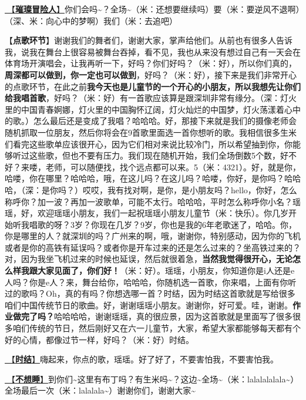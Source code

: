 \documentclass[]{ctexbook}
\begin{document}
\hyperref[adventurers]{🎵【\textbf{璀璨冒险人}】}你们会吗\textasciitilde？全场\textasciitilde（米：还想要继续吗）要（米：要逆风不退啊）（深、米：向心中的梦啊）我们（米：去追吧）

【\textbf{点歌环节}】谢谢我们的舞者们，谢谢大家，掌声给他们。从前也有很多人告诉我，说我在舞台上很容易被舞台吞掉，看不见，我也从来没有想过自己有一天会在体育场开演唱会，让我再听一下，好吗？你们好吗？（米：好），所以你们真的，\textbf{周深都可以做到，你一定也可以做到}，好吗？（米：好），接下来是我们非常开心的点歌环节，在此之前\textbf{我今天也是儿童节的一个开心的小朋友，所以我想先让你们给我唱首歌}，好吗？（米：好）有一首歌应该算是跟深圳非常有缘分。（深：灯火里的中国青春婀娜，灯火里的中国胸怀辽阔，灯火灿烂的中国梦，灯火荡漾着心中的歌。）怎么最后还是变成了我唱？哈哈哈。好，那接下来就是我们的摄像老师会随机抓取一位朋友，然后你将会在9首歌里面选一首你想听的歌。我相信很多生米们看完这些歌单应该很开心，因为它们相对来说比较冷门，所以希望抽到你，你能够听过这些歌，但也不要有压力。我们现在随机开始，我们全场倒数5个数，好不好？来喽，老师，可以随便找，找个远点都可以来。5（米：4321）。好，就是你，哈喽，你在哪里？哈哈哈，哦，在这儿吗？在这儿吗？哈喽，你好，是你吗？哈哈哈，（深：是你吗？）哎哎，我有找对啊，是你，是小朋友吗？hello，你好，怎么称呼你？加一波？再加一波歌单，可能不太行。哈哈哈，平时怎么称呼你小名？瑶瑶，好，欢迎瑶瑶小朋友，我们一起祝瑶瑶小朋友儿童节（米：快乐）。你几岁开始听我唱歌的呀？3岁？你现在几岁？9岁，你也是我的6年老歌迷了，哈哈。你，你是哪里的人？就深圳的吗？广州来的啊，哦，谢谢你，特别感动，因为你的飞机或者是你的高铁有延误吗？或者你是开车过来的还是怎么过来的？坐高铁过来的？对，因为我坐飞机过来的时候也延误，然后就很着急，\textbf{当然我觉得很开心，无论怎么样我跟大家见面了，你们好！}（米：好）。瑶瑶，小朋友，你知道你是i人还是e人吗？你是e人？来，舞台给你，哈哈哈，你随机选一首歌，你来唱，上面有你听过的歌吗？Oh，真的有吗？你想选哪一首？时结，因为时结这首歌就是写给很多咱们中国传统节日的歌曲。好，谢谢瑶瑶小朋友。谢谢你，好可爱。哇，谢谢。\textbf{作业做完了吗？}哈哈哈哈，谢谢瑶瑶，真的很应景，因为这首歌就是里面写了很多很多咱们传统的节日，然后刚好又在六一儿童节，大家，希望大家都能够每天都有个好的心情，都像过节一样，好吗？（米：好）时结。

\hyperref[shijie]{🎵【\textbf{时结}】}嗨起来，你点的歌，瑶瑶。好了好了，不要害怕我，不要害怕我。

\hyperref[keep-playing]{🎵【\textbf{不想睡}】}到你们\textasciitilde 这里有布丁吗？有生米吗\textasciitilde？这边\textasciitilde 全场\textasciitilde（米：lalalalalala\textasciitilde）全场最后一次（米：lalalala\textasciitilde）谢谢你们，谢谢大家\textasciitilde{}
\end{document}
